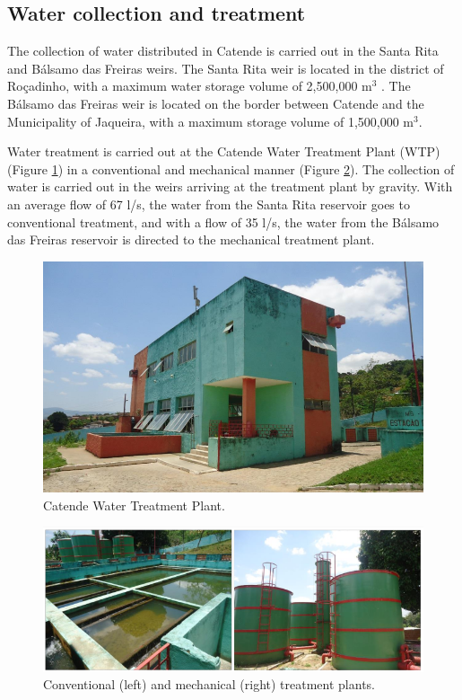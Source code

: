 \documentclass{singlecol}
\theoremstyle{TH}{
\newtheorem{lemma}{Lemma}
\newtheorem{theorem}[lemma]{Theorem}
\newtheorem{corrolary}[lemma]{Corrolary}
\newtheorem{conjecture}[lemma]{Conjecture}
\newtheorem{proposition}[lemma]{Proposition}
\newtheorem{claim}[lemma]{Claim}
\newtheorem{stheorem}[lemma]{Wrong Theorem}
\newtheorem{algorithm}{Algorithm}
}
\theoremstyle{THrm}{
\newtheorem{definition}{Definition}[section]
\newtheorem{question}{Question}[section]
\newtheorem{remark}{Remark}
\newtheorem{scheme}{Scheme}
}
\theoremstyle{THhit}{
\newtheorem{case}{Case}[section]
}
\begin{document}
\subsection{Water collection and treatment}

The collection of water distributed in Catende is carried out in the Santa Rita and Bálsamo das Freiras weirs. The Santa Rita weir is located in the district of Roçadinho, with a maximum water storage volume of 2,500,000 m$^3$ . The Bálsamo das Freiras weir is located on the border between Catende and the Municipality of Jaqueira, with a maximum storage volume of 1,500,000 m$^3$.

Water treatment is carried out at the Catende Water Treatment Plant (WTP) (Figure \ref{fig:WTP}) in a conventional and mechanical manner (Figure \ref{fig:WTPConvMec}). The collection of water is carried out in the weirs arriving at the treatment plant by gravity. With an average flow of 67 l/s, the water from the Santa Rita reservoir goes to conventional treatment, and with a flow of 35 l/s, the water from the Bálsamo das Freiras reservoir is directed to the mechanical treatment plant. 

\begin{figure}[h]
\caption{Catende Water Treatment Plant.}
\label{fig:WTP}
\centering
\includegraphics[width=\textwidth]{figures/ETACatende.png}
\end{figure}


\begin{figure}[h]
\caption{Conventional (left) and mechanical (right) treatment plants.}
\label{fig:WTPConvMec}
\centering
\includegraphics[width=\textwidth]{figures/ETAConvMec.png}
\end{figure}
\end{document}
